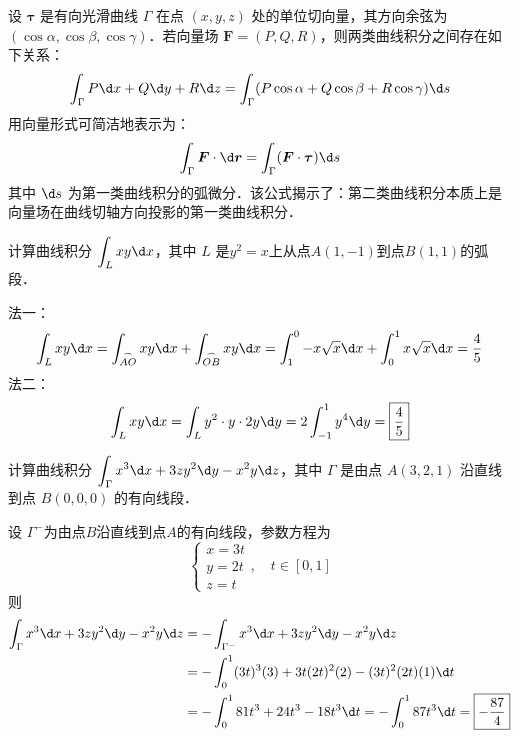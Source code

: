 \documentclass[12pt, a4paper, oneside, UTF8]{ctexbook}
\begin{document}
\begin{theorem}[两类曲线积分间的关系]
    设 $\bm{\tau}$ 是有向光滑曲线 $\Gamma$ 在点 $(x,y,z)$ 处的单位切向量，其方向余弦为 $(\cos \alpha, \cos \beta, \cos \gamma)$．若向量场 $\bm{F} = (P, Q, R)$，则两类曲线积分之间存在如下关系：
    \[ \int_\Gamma P \d x + Q \d y + R \d z = \int_\Gamma (P \cos \alpha + Q \cos \beta + R \cos \gamma) \d s \]
    用向量形式可简洁地表示为：
    \[ \int_\Gamma \bm{F} \cdot \d \bm{r} = \int_\Gamma (\bm{F} \cdot \bm{\tau}) \d s \]
    其中 $\d s$ 为第一类曲线积分的弧微分．该公式揭示了：第二类曲线积分本质上是向量场在曲线切轴方向投影的第一类曲线积分．
\end{theorem}
\begin{example}
    计算曲线积分 $\displaystyle\int_L xy\d x$，其中 $L$ 是$y^2=x$上从点$A(1,-1)$到点$B(1,1)$的弧段．
\end{example}
\begin{solution}
    法一：
    \[\int_L xy \d x = \int_{\overset{\frown}{AO}} xy \d x + \int_{\overset{\frown}{OB}} xy \d x = \int_{1}^{0} -x\sqrt{x}\d x + \int_{0}^{1} x\sqrt{x} \d x = \frac{4}{5}\]
    法二：
    \[\int_L xy \d x = \int_L y^2\cdot y\cdot 2y \d y = 2\int_{-1}^{1} y^4 \d y = \boxed{\frac{4}{5}}\]
\end{solution}
\begin{example}
    计算曲线积分 $\displaystyle\int_\Gamma x^3 \d x + 3zy^2 \d y - x^2y \d z$，其中 $\Gamma$ 是由点 $A(3,2,1)$ 沿直线到点 $B(0,0,0)$ 的有向线段．
\end{example}
\begin{solution}
    设 $\Gamma^-$为由点$B$沿直线到点$A$的有向线段，参数方程为
\[\begin{cases}
x = 3t \\
y = 2t \\
z = t
\end{cases}, \quad t \in [0,1]\]
    则\begin{align*}
        \int_\Gamma x^3 \d x + 3zy^2 \d y - x^2y \d z &= -\int_{\Gamma^-} x^3 \d x + 3zy^2 \d y - x^2y \d z \\
        &= -\int_0^1 (3t)^3(3) + 3t(2t)^2(2) - (3t)^2(2t)(1) \d t \\
        &= -\int_0^1 81t^3 + 24t^3 - 18t^3 \d t = -\int_0^1 87t^3 \d t = \boxed{-\frac{87}{4}}
    \end{align*}
\end{solution}
\end{document}
